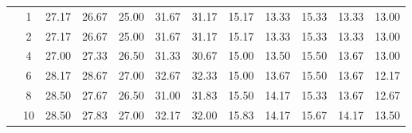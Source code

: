 \begin{table}[H]
\begin{tabular}{|c|c|c c c c c|c c c c c|}
\multicolumn{1}{|c|}{ \multirow{6}{*}{\rotatebox[origin=c]{90}{\textbf{K-vizinhos}}} }
&1	&27.17	&26.67	&25.00	&31.67	&31.17	&15.17	&13.33	&15.33	&13.33	&13.00\\\cline{2-12}
&2	&27.17	&26.67	&25.00	&31.67	&31.17	&15.17	&13.33	&15.33	&13.33	&13.00\\\cline{2-12}
&4	&27.00	&27.33	&26.50	&31.33	&30.67	&15.00	&13.50	&15.50	&13.67	&13.00\\\cline{2-12}
&6	&28.17	&28.67	&27.00	&32.67	&32.33	&15.00	&13.67	&15.50	&13.67	&12.17\\\cline{2-12}
&8	&28.50	&27.67	&26.50	&31.00	&31.83	&15.50	&14.17	&15.33	&13.67	&12.67\\\cline{2-12}
&10	&28.50	&27.83	&27.00	&32.17	&32.00	&15.83	&14.17	&15.67	&14.17	&13.50%

\\\midrule






	\end{tabular}
\end{table}



